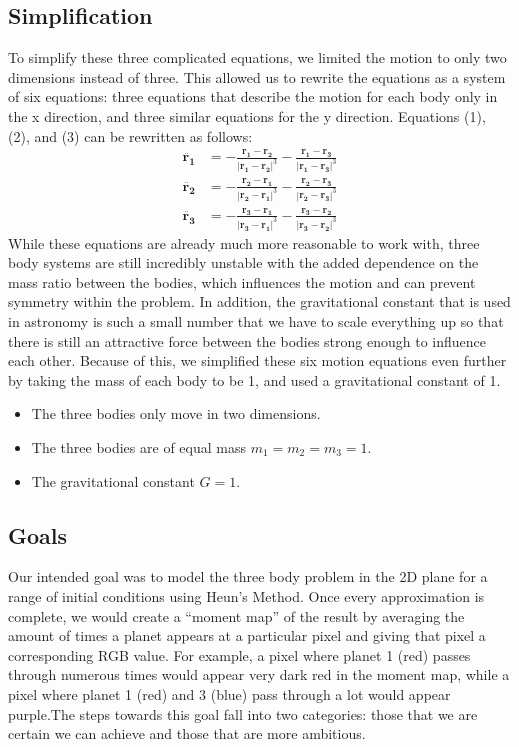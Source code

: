 \documentclass{article}
\begin{document}
\subsection{Simplification}

To simplify these three complicated equations, we limited the motion to only two dimensions instead of three. This allowed us to rewrite the equations as a system of six equations: three equations that describe the motion for each body only in the x direction, and three similar equations for the y direction. 
Equations (1), (2), and (3) can be rewritten as follows:
\begin{align}
    \ddot{\bm{r_1}} &= -\frac{\bm{r_1}-\bm{r_2}}{|\bm{r_1}-\bm{r_2}|^3}-\frac{\bm{r_1}-\bm{r_3}}{|\bm{r_1}-\bm{r_3}|^3}\\
    \ddot{\bm{r_2}} &= -\frac{\bm{r_2}-\bm{r_1}}{|\bm{r_2}-\bm{r_1}|^3}-\frac{\bm{r_2}-\bm{r_3}}{|\bm{r_2}-\bm{r_3}|^3}\\
    \ddot{\bm{r_3}} &= -\frac{\bm{r_3}-\bm{r_1}}{|\bm{r_3}-\bm{r_1}|^3}-\frac{\bm{r_3}-\bm{r_2}}{|\bm{r_3}-\bm{r_2}|^3}
\end{align}
While these equations are already much more reasonable to work with, three body systems are still incredibly unstable with the added dependence on the mass ratio between the bodies, which influences the motion and can prevent symmetry within the problem. In addition, the gravitational constant that is used in astronomy is such a small number that we have to scale everything up so that there is still an attractive force between the bodies strong enough to influence each other. Because of this, we simplified these six motion equations even further by taking the mass of each body to be 1, and used a gravitational constant of 1. 
\begin{itemize}
    \item The three bodies only move in two dimensions.
    \item The three bodies are of equal mass $m_1 = m_2 = m_3 = 1$.
    \item The gravitational constant $G = 1$.
\end{itemize}

\subsection{Goals}
Our intended goal was to model the three body problem in the 2D plane for a range of initial conditions using Heun's Method. Once every approximation is complete, we would create a “moment map” of the result by averaging the amount of times a planet appears at a particular pixel and giving that pixel a corresponding RGB value. For example, a pixel where planet 1 (red) passes through numerous times would appear very dark red in the moment map, while a pixel where planet 1 (red) and 3 (blue) pass through a lot would appear purple.The steps towards this goal fall into two categories: those that we are certain we can achieve and those that are more ambitious.
\end{document}
